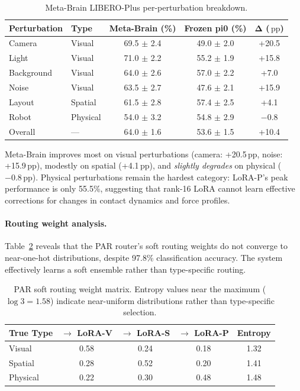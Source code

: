 \documentclass[letterpaper]{article}
\newcommand{\ours}{Meta-Brain}
\newcommand{\pp}{\,\text{pp}}
\begin{document}
\begin{table}[h]
\centering
\caption{\ours{} LIBERO-Plus per-perturbation breakdown.}
\label{tab:perturbation}
\small
\begin{tabular}{llccc}
\toprule
\textbf{Perturbation} & \textbf{Type} & \textbf{\ours{} (\%)} & \textbf{Frozen pi0 (\%)} & $\boldsymbol{\Delta}$ \textbf{($\pp$)} \\
\midrule
Camera & Visual & 69.5 $\pm$ 2.4 & 49.0 $\pm$ 2.0 & +20.5 \\
Light & Visual & 71.0 $\pm$ 2.2 & 55.2 $\pm$ 1.9 & +15.8 \\
Background & Visual & 64.0 $\pm$ 2.6 & 57.0 $\pm$ 2.2 & +7.0 \\
Noise & Visual & 63.5 $\pm$ 2.7 & 47.6 $\pm$ 2.1 & +15.9 \\
Layout & Spatial & 61.5 $\pm$ 2.8 & 57.4 $\pm$ 2.5 & +4.1 \\
Robot & Physical & 54.0 $\pm$ 3.2 & 54.8 $\pm$ 2.9 & $-$0.8 \\
\midrule
Overall & --- & 64.0 $\pm$ 1.6 & 53.6 $\pm$ 1.5 & +10.4 \\
\bottomrule
\end{tabular}
\end{table}

\ours{} improves most on visual perturbations (camera: +20.5$\pp$, noise: +15.9$\pp$), modestly on spatial (+4.1$\pp$), and \emph{slightly degrades} on physical ($-0.8\pp$). Physical perturbations remain the hardest category: LoRA-P's peak performance is only 55.5\%, suggesting that rank-16 LoRA cannot learn effective corrections for changes in contact dynamics and force profiles.

\paragraph{Routing weight analysis.}
Table~\ref{tab:routing_weights} reveals that the PAR router's soft routing weights do not converge to near-one-hot distributions, despite 97.8\% classification accuracy. The system effectively learns a soft ensemble rather than type-specific routing.

\begin{table}[h]
\centering
\caption{PAR soft routing weight matrix. Entropy values near the maximum ($\log 3 = 1.58$) indicate near-uniform distributions rather than type-specific selection.}
\label{tab:routing_weights}
\small
\begin{tabular}{lcccc}
\toprule
\textbf{True Type} & $\boldsymbol{\to}$ \textbf{LoRA-V} & $\boldsymbol{\to}$ \textbf{LoRA-S} & $\boldsymbol{\to}$ \textbf{LoRA-P} & \textbf{Entropy} \\
\midrule
Visual & 0.58 & 0.24 & 0.18 & 1.32 \\
Spatial & 0.28 & 0.52 & 0.20 & 1.41 \\
Physical & 0.22 & 0.30 & 0.48 & 1.48 \\
\bottomrule
\end{tabular}
\end{table}
\end{document}
